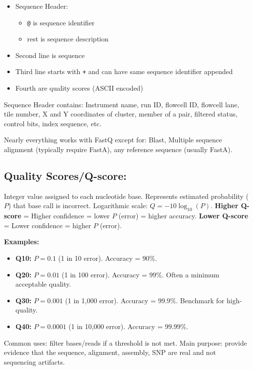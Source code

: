 \documentclass[../main.tex]{subfiles}
\begin{document}
\begin{itemize}
    \item Sequence Header:
    \begin{itemize}
        \item \texttt{@} is sequence identifier
        \item rest is sequence description
    \end{itemize}
    \item Second line is sequence
    \item Third line starts with \texttt{+} and can have same sequence identifier appended
    \item Fourth are quality scores (ASCII encoded)
\end{itemize}
Sequence Header contains: Instrument name, run ID, flowcell ID, flowcell lane, tile number, X and Y coordinates of cluster, member of a pair, filtered status, control bits, index sequence, etc.

Nearly everything works with FastQ except for: Blast, Multiple sequence alignment (typically require FastA), any reference sequence (usually FastA).

\subsection*{Quality Scores/Q-score:} Integer value assigned to each nucleotide base. Represents estimated probability ($P$) that base call is incorrect. Logarithmic scale: $Q = -10\log_{10}(P)$.
\textbf{Higher Q-score} = Higher confidence = lower $P$ (error) = higher accuracy.
\textbf{Lower Q-score} = Lower confidence = higher $P$ (error).

\textbf{Examples:}
\begin{itemize}
    \item \textbf{Q10:} $P=0.1$ (1 in 10 error). Accuracy = $90\%$.
    \item \textbf{Q20:} $P=0.01$ (1 in 100 error). Accuracy = $99\%$. Often a minimum acceptable quality.
    \item \textbf{Q30:} $P=0.001$ (1 in 1,000 error). Accuracy = $99.9\%$. Benchmark for high-quality.
    \item \textbf{Q40:} $P=0.0001$ (1 in 10,000 error). Accuracy = $99.99\%$.
\end{itemize}

Common uses: filter bases/reads if a threshold is not met.
Main purpose: provide evidence that the sequence, alignment, assembly, SNP are real and not sequencing artifacts.
\end{document}

